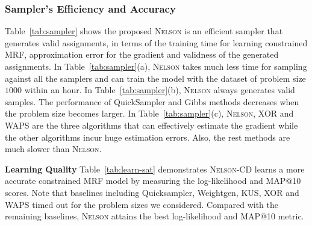 \documentclass[letterpaper]{article} %
\newcommand{\nls}{\textsc{Nelson}\xspace}
\begin{document}
\subsubsection{Sampler's Efficiency and Accuracy}  Table~\ref{tab:sampler} shows the proposed \nls is an efficient sampler  that generates valid assignments, in terms of the training time for learning constrained MRF, approximation error for the gradient and  validness of the generated  assignments. In Table~\ref{tab:sampler}(a), \nls takes much less time for sampling against all the samplers and can train the model with the dataset of problem size $1000$ within an hour. In Table~\ref{tab:sampler}(b), \nls always generates valid samples. {The performance of} QuickSampler and Gibbs methods decreases when the problem size becomes larger.  In Table~\ref{tab:sampler}(c), \nls, XOR and WAPS are the three algorithms that can effectively estimate the gradient while the other algorithms incur huge estimation errors. Also, the rest methods are much slower than \nls. %





\noindent\textbf{Learning Quality}  Table~\ref{tab:learn-sat} demonstrates \nls-CD learns a more accurate  constrained MRF model by measuring the log-likelihood and MAP@10 scores. Note that baselines including Quicksampler, Weightgen, KUS, XOR and WAPS  timed out for the problem sizes we considered. Compared with the remaining baselines,  \nls attains the best log-likelihood and MAP@10 metric. 
\end{document}
